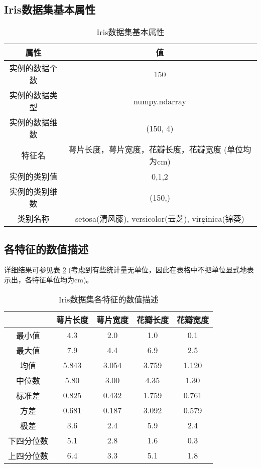\documentclass[12pt,a4paper]{article}
\theoremstyle{definition}
\begin{document}
\subsection{Iris数据集基本属性}

\begin{table}[H]
	\renewcommand\arraystretch{1.35}
	\caption{Iris数据集基本属性}
	\label{tab:iris_basic}
	\centering
	
	\begin{tabular}{c|c}
		\centering
		属性 & 值 \\
		\hline
		实例的数据个数 & 150 \\
		实例的数据类型 & numpy.ndarray \\
		实例的数据维数 & (150, 4) \\
		特征名 & 萼片长度，萼片宽度，花瓣长度，花瓣宽度 (单位均为cm) \\
		实例的类别值 & 0,1,2 \\
		实例的类别维数 & (150,) \\
		类别名称 & setosa(清风藤), versicolor(云芝), virginica(锦葵) \\
	\end{tabular}
\end{table}

\subsection{各特征的数值描述}

详细结果可参见表 \ref{tab:iris_att} (考虑到有些统计量无单位，因此在表格中不把单位显式地表示出，各特征单位均为cm)。

\begin{table}[H]
	\renewcommand\arraystretch{1.35}
	\caption{Iris数据集各特征的数值描述}
	\label{tab:iris_att}
	\centering
	
	\begin{tabular}{c|cccc}
		\centering
		 & 萼片长度 & 萼片宽度 & 花瓣长度 & 花瓣宽度 \\
		\hline
		最小值 & 4.3 & 2.0 & 1.0 & 0.1 \\
		最大值 & 7.9 & 4.4 & 6.9 & 2.5 \\
		均值 & 5.843 & 3.054 & 3.759 & 1.120 \\
		中位数 & 5.80 & 3.00 & 4.35 & 1.30 \\
		标准差 & 0.825 & 0.432 & 1.759 & 0.761 \\
		方差 & 0.681 & 0.187 & 3.092 & 0.579 \\
		极差 & 3.6 & 2.4 & 5.9 & 2.4 \\
		下四分位数 & 5.1 & 2.8 & 1.6 & 0.3 \\
		上四分位数 & 6.4 & 3.3 & 5.1 & 1.8 \\
	\end{tabular}
\end{table}
\end{document}
